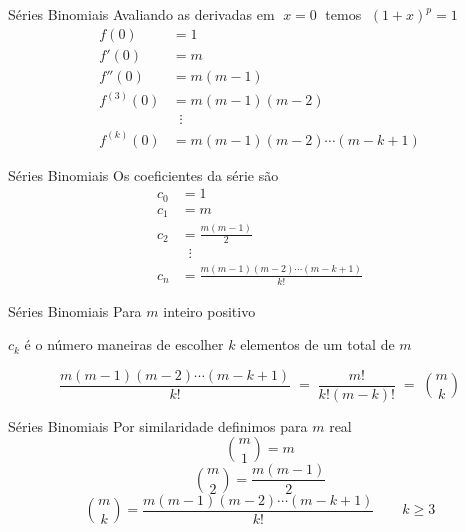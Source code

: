 \begin{frame}{Séries Binomiais}
Avaliando as derivadas em \emph{\(\;x=0\;\)} temos \(\;(1+x)^p=1\;\)
\begin{align*}
  f(0)       & = 1                        \\[2mm]
  f'(0)      & = m                        \\[2mm]
  f''(0)     & = m(m-1)                   \\[2mm]
  f^{(3)}(0) & = m(m-1)(m-2)              \\
             & \;\;\vdots                 \\
  f^{(k)}(0) & = m(m-1)(m-2)\cdots(m-k+1)
\end{align*}
\end{frame}

\begin{frame}{Séries Binomiais}
Os coeficientes da série são
\begin{align*}
	c_0 & = 1                        \\[2mm]
	c_1 & = m                        \\[2mm]
	c_2 & = \frac{m(m-1)}{2}         \\[2mm]
	    & \;\;\vdots                 \\
	c_n & = \frac{m(m-1)(m-2)\cdots(m-k+1)}{k!}
\end{align*}
\end{frame}

\begin{frame}{Séries Binomiais}
Para $m$ inteiro positivo

$c_k$ é o número maneiras de escolher $k$ elementos de um total de $m$

\vspace{\baselineskip}
\[
  \frac{m(m-1)(m-2)\cdots(m-k+1)}{k!} \;=\; \frac{m!}{k!(m-k)!} \;=\; \binom{m}{k}
\]
\end{frame}

\begin{frame}{Séries Binomiais}
Por similaridade definimos para $m$ real
\[
  \binom{m}{1} = m
\]
\hfill
\[
  \binom{m}{2} = \frac{m(m-1)}{2}
\]
\hfill
\[
  \binom{m}{k} = \frac{m(m-1)(m-2)\cdots(m-k+1)}{k!} \qquad k \geq 3
\]
\hfill
\end{frame}

